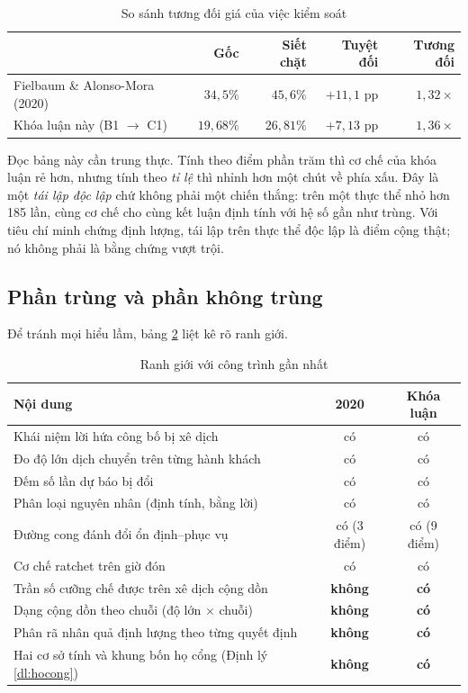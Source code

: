 \begin{table}[htbp]
\centering
\caption{So sánh tương đối giá của việc kiểm soát}
\label{bang:sosanh-tuongdoi}
\small
\begin{tabular}{@{}lrrrr@{}}
\toprule
& \textbf{Gốc} & \textbf{Siết chặt} & \textbf{Tuyệt đối} & \textbf{Tương đối}\\
\midrule
Fielbaum \& Alonso-Mora (2020) & $34{,}5\%$ & $45{,}6\%$ & $+11{,}1$ pp & $1{,}32\times$\\
Khóa luận này (B1 $\to$ C1) & $19{,}68\%$ & $26{,}81\%$ & $+7{,}13$ pp & $1{,}36\times$\\
\bottomrule
\end{tabular}
\end{table}

Đọc bảng này cần trung thực. Tính theo điểm phần trăm thì cơ chế của khóa luận rẻ hơn, nhưng
tính theo \emph{tỉ lệ} thì nhỉnh hơn một chút về phía xấu. Đây là một \emph{tái lập độc lập}
chứ không phải một chiến thắng: trên một thực thể nhỏ hơn 185 lần, cùng cơ chế cho cùng kết luận
định tính với hệ số gần như trùng. Với tiêu chí minh chứng định lượng, tái lập trên thực thể độc
lập là điểm cộng thật; nó không phải là bằng chứng vượt trội.

\subsection{Phần trùng và phần không trùng}

Để tránh mọi hiểu lầm, bảng \ref{bang:trung} liệt kê rõ ranh giới.

\begin{table}[htbp]
\centering
\caption{Ranh giới với công trình gần nhất}
\label{bang:trung}
\small
\begin{tabular}{@{}p{7.2cm}cc@{}}
\toprule
\textbf{Nội dung} & \textbf{2020} & \textbf{Khóa luận}\\
\midrule
Khái niệm lời hứa công bố bị xê dịch & có & có\\
Đo độ lớn dịch chuyển trên từng hành khách & có & có\\
Đếm số lần dự báo bị đổi & có & có\\
Phân loại nguyên nhân (định tính, bằng lời) & có & có\\
Đường cong đánh đổi ổn định--phục vụ & có (3 điểm) & có (9 điểm)\\
Cơ chế ratchet trên giờ đón & có & có\\
\midrule
Trần số cưỡng chế được trên xê dịch cộng dồn & \textbf{không} & \textbf{có}\\
Dạng cộng dồn theo chuỗi (độ lớn $\times$ chuỗi) & \textbf{không} & \textbf{có}\\
Phân rã nhân quả định lượng theo từng quyết định & \textbf{không} & \textbf{có}\\
Hai cơ sở tính và khung bốn họ cổng (Định lý \ref{dl:hocong}) & \textbf{không} & \textbf{có}\\
\bottomrule
\end{tabular}
\end{table}

